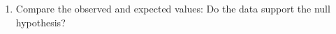 \begin{noheadline}
\begin{frame}
\begin{adjustwidth}{-1.5em}{-1.5em}
\begin{enumerate}
        \item Compare the observed and expected values: Do the data support the
            null hypothesis?
    \end{enumerate}
    \end{adjustwidth}
\end{frame}
\end{noheadline}



\clickerslide{
\begin{frame}
    \begin{clickerquestion}
        \item 
        \begin{clickeroptions}
            \item 
            \item 
            \item 
            \item 
        \end{clickeroptions}
    \end{clickerquestion}
\end{frame}
}

